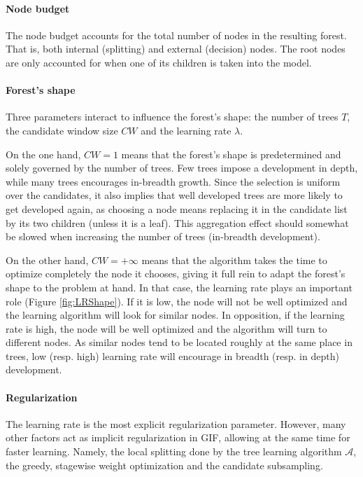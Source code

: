 \documentclass{article}
\begin{document}
\paragraph{Node budget}
The node budget accounts for the total number of nodes in the resulting forest. 
That is, both internal (splitting) and external (decision) nodes. The root 
nodes are only accounted for when one of its children is taken into the model.

\paragraph{Forest's shape}
Three parameters interact to influence the forest's shape: the number of trees 
$T$, the candidate window size $CW$ and the learning rate $\lambda$. 

On the one hand, $CW=1$ means that the forest's shape is predetermined and 
solely governed by the number of trees. Few trees impose a development in 
depth, while many trees encourages in-breadth growth. Since the selection 
is uniform over the candidates, it also implies that well developed trees are 
more likely to get developed again, as choosing a node means replacing it in 
the candidate list by its two children (unless it is a leaf). This aggregation 
effect should somewhat be slowed when increasing the number of trees 
(in-breadth development).

On the other hand, $CW=+\infty$ means that the algorithm takes the 
time to optimize completely the node it chooses, giving it full rein to adapt 
the forest's shape to the problem at hand. In that case, the learning rate 
plays an important role (Figure \ref{fig:LRShape}). If it is low, the node will 
not be well optimized and the learning algorithm will look for similar nodes. 
In opposition, if the learning rate is high, the node will be well optimized 
and the algorithm will turn to different nodes.
As similar nodes tend to be located roughly at the same place in trees, low 
(resp. high) learning rate will encourage in breadth (resp. in depth) 
development.

\paragraph{Regularization}
The learning rate is the most explicit regularization parameter. However, many 
other factors act as implicit regularization in GIF, allowing at the same time 
for faster learning. 
Namely, the local splitting done by the tree learning algorithm $\mathcal{A}$, 
the greedy, stagewise weight optimization and the candidate subsampling.
\end{document}

